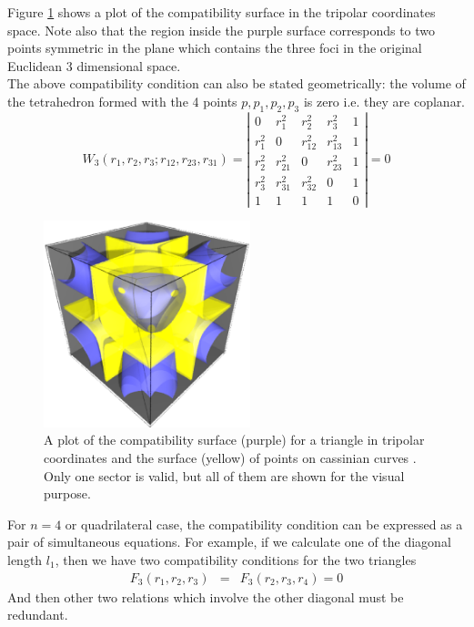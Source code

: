\documentclass{article}
\begin{document}
Figure \ref{fig:compat_tripol} shows a plot of the compatibility surface in the tripolar coordinates space. Note also that the region inside the purple surface corresponds to two points symmetric in the plane which contains the three foci in the original Euclidean 3 dimensional space. \\
The above compatibility condition can also be stated geometrically: the volume of the tetrahedron formed with the 4 points $p, p_1, p_2, p_3$ is zero i.e. they are coplanar. 
\begin{equation}
\label{}
W_3(r_1,r_2,r_3;r_{12},r_{23},r_{31}) =\left|\begin{array}{ccccc}
0 &  r_{1}^2 & r_{2}^2 & r_{3}^2 & 1 \\
r_{1}^2 &  0 & r_{12}^2 & r_{13}^2 & 1 \\
r_{2}^2 &  r_{21}^2 & 0 & r_{23}^2 & 1 \\
r_{3}^2 &  r_{31}^2 & r_{32}^2 & 0 & 1 \\
 1 & 1 & 1 & 1 & 0  
\end{array}\right|=0
\end{equation} 
\begin{figure}[H]
\begin{center}
\includegraphics[width=6cm]{compatibility_tripolar.eps}
\caption{A plot of the compatibility surface (purple) for a triangle in tripolar coordinates and the surface (yellow) of points on cassinian curves . Only one sector is valid, but all of them are shown for the visual purpose.}
\label{fig:compat_tripol}
\end{center}
\end{figure}
For $n=4$ or quadrilateral case, the compatibility condition can be expressed as a pair of simultaneous equations. For example, if we calculate one of the diagonal length $l_1$, then we have two compatibility conditions for the two triangles
\begin{eqnarray}
F_3(r_1,r_2,r_3)  & = & F_3(r_2,r_3,r_4)   =  0   
\end{eqnarray}
And then other two relations which involve the other diagonal must be redundant.
\end{document}
